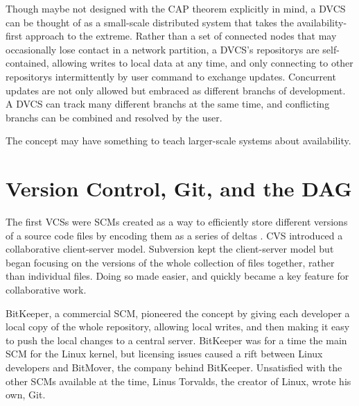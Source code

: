 Though maybe not designed with the CAP theorem explicitly in mind, a \gls{DVCS}
can be thought of as a small-scale distributed system that takes the
availability-first approach to the extreme. Rather than a set of connected nodes
that may occasionally lose contact in a network partition, a \gls{DVCS}'s
\glspl{repository} are self-contained, allowing writes to local data at any
time, and only connecting to other \glspl{repository} intermittently by user
command to exchange updates. Concurrent updates are not only allowed but
embraced as different \glspl{branch} of development. A \gls{DVCS} can track many
different \glspl{branch} at the same time, and conflicting \glspl{branch} can be
combined and resolved by the user.

The  concept may have something to
teach larger-scale systems about availability.

%



\section{Version Control, Git, and the DAG}

The first \glspl{VCS} were \glspl{SCM} created as a way to efficiently store
different versions of a source code files by encoding them as a series of deltas
\cite{history_of_version_control}. CVS introduced a collaborative client-server
model\cite{history_of_version_control,cvs_book}. Subversion kept the
client-server model but began focusing on the versions of the whole collection
of files together, rather than individual
files\cite{history_of_version_control,svnbook}. Doing so made
 easier, and  quickly
became a key feature for collaborative work.

BitKeeper, a commercial \gls{SCM}, pioneered the  concept by giving each developer a local copy of the whole
\gls{repository}, allowing local writes, and then making it easy to push the
local changes to a central
server\cite{history_of_version_control,git_10_years_interview}. BitKeeper was
for a time the main \acrlong{SCM} for the Linux kernel, but licensing issues
caused a rift between Linux developers and BitMover, the company behind
BitKeeper. Unsatisfied with the other \glspl{SCM} available at the time, Linus
Torvalds, the creator of Linux, wrote his own,
Git\cite{history_of_version_control,git_10_years_interview}.

